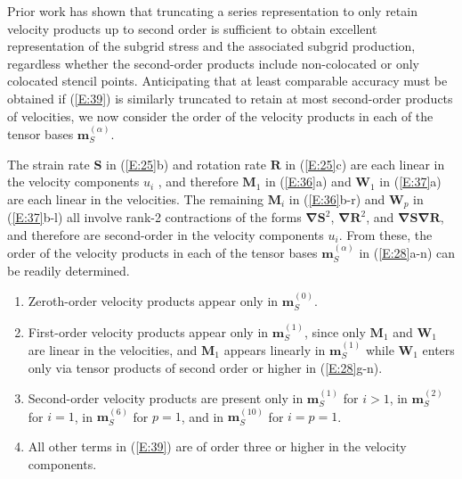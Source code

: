 Prior work has shown that truncating a  series representation to only retain velocity products up to second order is sufficient to obtain excellent representation of the subgrid stress and the associated subgrid production, regardless whether the second-order products include non-colocated or only colocated stencil points.  Anticipating that at least comparable accuracy must be obtained if (\ref{E:39}) is similarly truncated to retain at most second-order products of velocities, we now consider the order of the velocity products in each of the tensor bases  $\mathbf{m}^{(\alpha)}_{S}$.


The strain rate $\mathbf{S}$ in (\ref{E:25}b) and rotation rate $\mathbf{R}$ in (\ref{E:25}c) are each linear in the velocity components $u_i$ , and therefore  $\mathbf{M}_1$ in (\ref{E:36}a) and $\mathbf{W}_1$  in (\ref{E:37}a) are each linear in the velocities.  The remaining $\mathbf{M}_i$  in (\ref{E:36}b-r) and  $\mathbf{W}_p$ in (\ref{E:37}b-l) all involve rank-2 contractions of the forms $\mathbf{\nabla S}^2$, $\mathbf{\nabla R}^2$, and $\mathbf{\nabla S \nabla R}$, and therefore are second-order in the velocity components $u_i$.  From these, the order of the velocity products in each of the tensor bases $\mathbf{m}^{(\alpha)}_{S}$  in (\ref{E:28}a-n) can be readily determined.  
%
\begin{enumerate}[label=\emph({\alph*})]
%	
	\item	Zeroth-order velocity products appear only in $\mathbf{m}^{(0)}_{S}$.  
%	
	\item   First-order velocity products appear only in $\mathbf{m}^{(1)}_{S}$, since only   $\mathbf{M}_{1}$  and $\mathbf{W}_{1}$ are linear in the velocities, and $\mathbf{M}_{1}$   appears linearly in  $\mathbf{m}^{(1)}_{S}$ while  $\mathbf{W}_{1}$ enters only via tensor products of second order or higher in (\ref{E:28}g-n).  
%	
	\item   Second-order velocity products are present only in $\mathbf{m}^{(1)}_{S}$ for $i > 1$, in $\mathbf{m}^{(2)}_{S}$  for $i=1$, in  $\mathbf{m}^{(6)}_{S}$ for $p=1$, and in $\mathbf{m}^{(10)}_{S}$  for $i = p = 1$.
%	
	\item   All other terms in (\ref{E:39}) are of order three or higher in the velocity components.
%
\end{enumerate}
%
%   

